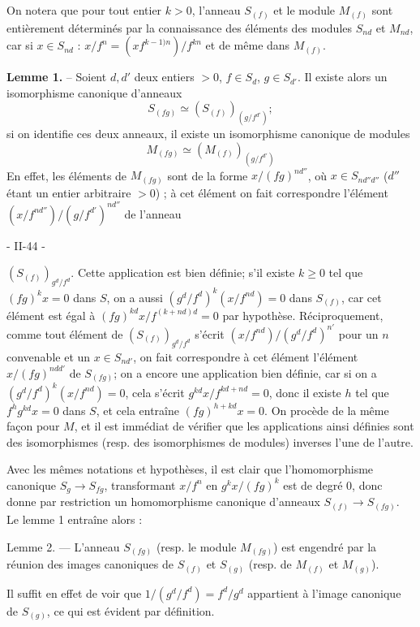On notera que pour tout entier $k > 0$, l'anneau $S_{(f)}$ et le module $M_{(f)}$ sont entièrement déterminés par la connaissance des éléments des modules $S_{nd}$ et $M_{nd}$, car si $x \in S_{nd}$ : $x/f^n = (x f^{k-1)n}) / f^{kn}$ et de même dans $M_{(f)}$.

\noindent \textbf{Lemme 1.} -- Soient $d, d'$ deux entiers $> 0$, $f \in S_d$, $g \in S_{d'}$. Il existe alors un isomorphisme canonique d'anneaux
$$S_{(fg)} \simeq (S_{(f)})_{(g/f^{d'})} ;$$
si on identifie ces deux anneaux, il existe un isomorphisme canonique de modules
$$M_{(fg)} \simeq (M_{(f)})_{(g/f^{d'})}$$
En effet, les éléments de $M_{(fg)}$ sont de la forme $x/(fg)^{nd''}$, où $x \in S_{nd''d''}$ ($d''$ étant un entier arbitraire $> 0$) ; à cet élément on fait correspondre l'élément $(x/f^{nd''}) / (g/f^{d'})^{nd''}$ de l'anneau

\newpage


- II-44 -

$ (S_{(f)})_{g^d/f^d} $. Cette application est bien définie; s'il existe $k \geqslant 0$ tel que $(fg)^k x = 0$ dans $S$, on a aussi $(g^d/f^d)^k (x/f^{nd}) = 0$ dans $S_{(f)}$, car cet élément est égal à $(fg)^{kd} x / f^{(k+nd)d} = 0$ par hypothèse. Réciproquement, comme tout élément de $(S_{(f)})_{g^d/f^d}$ s'écrit $(x/f^{nd}) / (g^d/f^d)^{n'}$ pour un $n$ convenable et un $x \in S_{nd'}$, on fait correspondre à cet élément l'élément $x/(fg)^{nd d'}$ de $S_{(fg)}$; on a encore une application bien définie, car si on a $(g^d/f^d)^k (x/f^{nd}) = 0$, cela s'écrit $g^{kd} x / f^{kd+nd} = 0$, donc il existe $h$ tel que $f^h g^{kd} x = 0$ dans $S$, et cela entraîne $(fg)^{h+kd} x = 0$. On procède de la même façon pour $M$, et il est immédiat de vérifier que les applications ainsi définies sont des isomorphismes (resp. des isomorphismes de modules) inverses l'une de l'autre.

Avec les mêmes notations et hypothèses, il est clair que l'homomorphisme canonique $S_g \to S_{fg}$, transformant $x/f^n$ en $g^k x / (fg)^k$ est de degré 0, donc donne par restriction un homomorphisme canonique d'anneaux $S_{(f)} \to S_{(fg)}$. Le lemme 1 entraîne alors :

Lemme 2. — L'anneau $S_{(fg)}$ (resp. le module $M_{(fg)}$) est engendré par la réunion des images canoniques de $S_{(f)}$ et $S_{(g)}$ (resp. de $M_{(f)}$ et $M_{(g)}$).

Il suffit en effet de voir que $1/(g^d/f^d) = f^d/g^d$ appartient à l'image canonique de $S_{(g)}$, ce qui est évident par définition.

